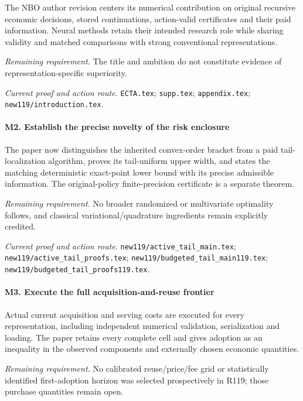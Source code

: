 The NBO author revision centers its numerical contribution on original recursive economic decisions, stored continuations, action-valid certificates and their paid information. Neural methods retain their intended research role while sharing validity and matched comparisons with strong conventional representations.

\par\emph{Remaining requirement.} The title and ambition do not constitute evidence of representation-specific superiority.

\par\emph{Current proof and action route.} \nolinkurl{ECTA.tex}; \nolinkurl{supp.tex}; \nolinkurl{appendix.tex}; \nolinkurl{new119/introduction.tex}.

\paragraph{M2. Establish the precise novelty of the risk enclosure}

The paper now distinguishes the inherited convex-order bracket from a paid tail-localization algorithm, proves its tail-uniform upper width, and states the matching deterministic exact-point lower bound with its precise admissible information. The original-policy finite-precision certificate is a separate theorem.

\par\emph{Remaining requirement.} No broader randomized or multivariate optimality follows, and classical variational/\allowbreak{}quadrature ingredients remain explicitly credited.

\par\emph{Current proof and action route.} \nolinkurl{new119/active_tail_main.tex}; \nolinkurl{new119/active_tail_proofs.tex}; \nolinkurl{new119/budgeted_tail_main119.tex}; \nolinkurl{new119/budgeted_tail_proofs119.tex}.

\paragraph{M3. Execute the full acquisition-and-reuse frontier}

Actual current acquisition and serving costs are executed for every representation, including independent numerical validation, serialization and loading. The paper retains every complete cell and gives adoption as an inequality in the observed components and externally chosen economic quantities.

\par\emph{Remaining requirement.} No calibrated reuse/\allowbreak{}price/\allowbreak{}fee grid or statistically identified first-adoption horizon was selected prospectively in R119; those purchase quantities remain open.

